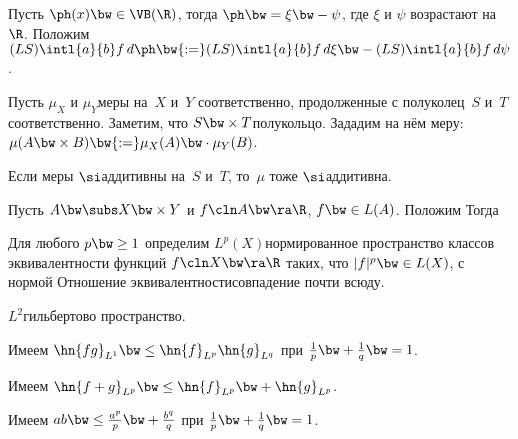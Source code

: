 \documentclass[a4paper,draft]{article}
\begin{document}
\begin{df}
  Пусть $\ph(x) \bw\in \VB(\R)$, тогда $\ph \bw= \xi \bw- \psi$,
  где $\xi$ и $\psi$ возрастают на $\R$. Положим
  $(LS)\intl{a}{b}f\,d\ph \bw{:=} (LS) \intl{a}{b}f\,d\xi \bw-(LS)\intl{a}{b}f\,d\psi$.
\end{df}

\begin{df}
  Пусть $\mu_X$ и $\mu_Y$\т меры на~$X$ и~$Y$ соответственно, продолженные с полуколец~$S$ и~$T$
  соответственно. Заметим, что $S\bw\times T$\т полукольцо. Зададим на нём
  меру: $\mu(A\bw\times B) \bw{:=} \mu_X(A)\bw\cdot \mu_Y(B)$.
\end{df}

\begin{theorem}
  Если меры $\si$\д аддитивны на~$S$ и~$T$, то~$\mu$ тоже $\si$\д аддитивна.
\end{theorem}

\begin{theorem}[Фубини]
  Пусть $A \bw\subs X \bw\times Y$ и $f\cln A \bw\ra \R$, $f \bw\in L(A)$. Положим
  Тогда
\end{theorem}

\begin{df}
  Для любого $p\bw\ge1$ определим $L^p(X)$\т нормированное
  пространство классов эквивалентности функций $f\cln X\bw\ra \R$ таких, что $|f|^p \bw\in L(X)$,
  с нормой 
  Отношение эквивалентности\т совпадение почти всюду.
\end{df}

\begin{note}
  $L^2$\т гильбертово пространство.
\end{note}

\begin{theorem}
  Имеем $\hn{f g}_{L^1} \bw\le \hn{f}_{L^p} \hn{g}_{L^q}$ при $\frac1p \bw+ \frac1q \bw=1$.
\end{theorem}

\begin{theorem}
  Имеем $\hn{f+g}_{L^p} \bw\le \hn{f}_{L^p} \bw+ \hn{g}_{L^p}$.
\end{theorem}

\begin{theorem}
  Имеем $ab \bw \le\frac{a^p}p \bw+ \frac{b^q}q$ при $\frac1p \bw+ \frac1q \bw=1$.
\end{theorem}
\end{document}
